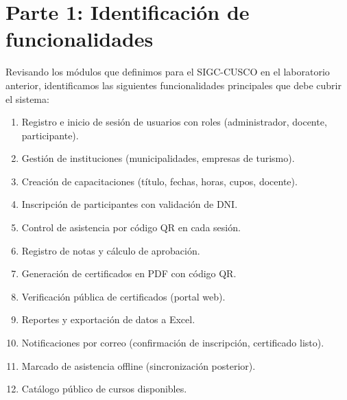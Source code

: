 \section{Parte 1: Identificación de funcionalidades}

Revisando los módulos que definimos para el SIGC-CUSCO en el laboratorio anterior, identificamos las siguientes funcionalidades principales que debe cubrir el sistema:

\begin{enumerate}[nosep]
    \item Registro e inicio de sesión de usuarios con roles (administrador, docente, participante).
    \item Gestión de instituciones (municipalidades, empresas de turismo).
    \item Creación de capacitaciones (título, fechas, horas, cupos, docente).
    \item Inscripción de participantes con validación de DNI.
    \item Control de asistencia por código QR en cada sesión.
    \item Registro de notas y cálculo de aprobación.
    \item Generación de certificados en PDF con código QR.
    \item Verificación pública de certificados (portal web).
    \item Reportes y exportación de datos a Excel.
    \item Notificaciones por correo (confirmación de inscripción, certificado listo).
    \item Marcado de asistencia offline (sincronización posterior).
    \item Catálogo público de cursos disponibles.
\end{enumerate}

